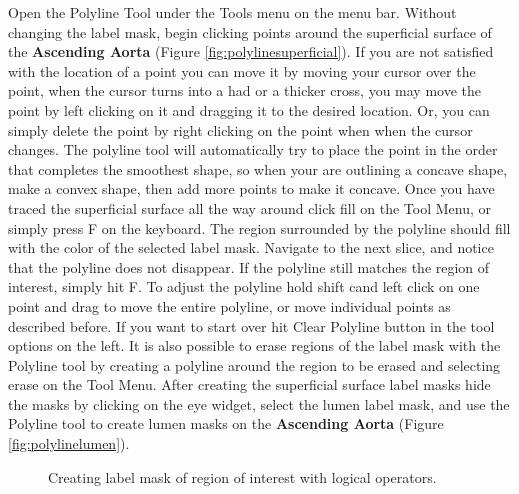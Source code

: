 \documentclass[fleqn,11pt,openany]{book}
\begin{document}
Open the Polyline Tool under the Tools menu on the menu bar.  Without changing the label mask, begin clicking points around the superficial surface of the {\bf Ascending Aorta} (Figure \ref{fig:polylinesuperficial}).  If you are not satisfied with the location of a point you can move it by moving your cursor over the point, when the cursor turns into a had or a thicker cross, you may move the point by left clicking on it and dragging it to the desired location.  Or, you can simply delete the point by right clicking on the point when when the cursor changes.  The polyline tool will automatically try to place the point in the order that completes the smoothest shape, so when your are outlining a concave shape, make a convex shape, then add more points to make it concave.  Once you have traced the superficial surface all the way around click fill on the Tool Menu, or simply press F on the keyboard.  The region surrounded by the polyline should fill with the color of the selected label mask. Navigate to the next slice, and notice that the polyline does not disappear.  If the polyline still matches the region of interest, simply hit F.  To adjust the polyline hold shift cand left click on one point and drag to move the entire polyline, or move individual points as described before.  If you want to start over hit Clear Polyline button in the tool options on the left.  It is also possible to erase regions of the label mask with the Polyline tool by creating a polyline around the region to be erased and selecting erase on the Tool Menu.  After creating the superficial surface label masks hide the masks by clicking on the eye widget, select the lumen label mask, and use the Polyline tool to create lumen masks on the {\bf Ascending Aorta} (Figure \ref{fig:polylinelumen}).


\begin{figure}
\caption{Creating label mask of region of interest with logical operators.}\label{fig:logicaloperators}
\end{figure}
\end{document}
